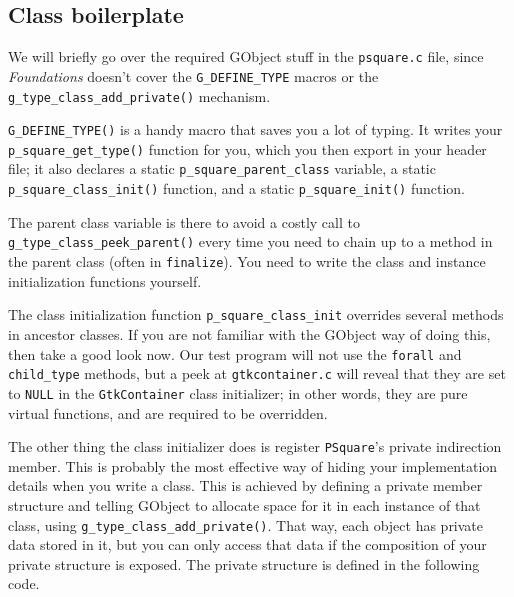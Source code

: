 \documentclass[%
			   halfparskip,smallheadings,pointlessnumbers]%
			   {scrartcl} %
\begin{document}
\subsection{Class boilerplate}

We will briefly go over the required GObject stuff in the \texttt{psquare.c} file, since \emph{Foundations} doesn't cover the \lstinline$G_DEFINE_TYPE$ macros or the \lstinline$g_type_class_add_private()$ mechanism.

\lstinline$G_DEFINE_TYPE()$ is a handy macro that saves you a lot of typing. It writes your \lstinline$p_square_get_type()$ function for you, which you then export in your header file; it also declares a static \lstinline$p_square_parent_class$ variable, a static \lstinline$p_square_class_init()$ function, and a static \lstinline$p_square_init()$ function.



The parent class variable is there to avoid a costly call to \lstinline$g_type_class_peek_parent()$ every time you need to chain up to a method in the parent class (often in \lstinline$finalize$). You need to write the class and instance initialization functions yourself.



The class initialization function \lstinline$p_square_class_init$ overrides several methods in ancestor classes. If you are not familiar with the GObject way of doing this, then take a good look now. Our test program will not use the \lstinline$forall$ and \lstinline$child_type$ methods, but a peek at \texttt{gtkcontainer.c} will reveal that they are set to \lstinline$NULL$ in the \lstinline$GtkContainer$ class initializer; in other words, they are pure virtual functions, and are required to be overridden.

The other thing the class initializer does is register \lstinline$PSquare$'s private indirection member. This is probably the most effective way of hiding your implementation details when you write a class. This is achieved by defining a private member structure and telling GObject to allocate space for it in each instance of that class, using \lstinline$g_type_class_add_private()$. That way, each object has private data stored in it, but you can only access that data if the composition of your private structure is exposed. The private structure is defined in the following code.


\end{document}
